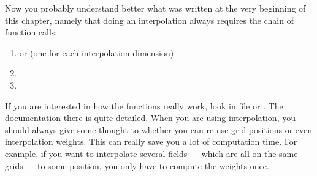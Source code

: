 Now you probably understand better what was written at the very
beginning of this chapter, namely that doing an interpolation always
requires the chain of function calls:
\begin{enumerate}
\item {} or  (one for each interpolation dimension)
\item {}
\item {}
\end{enumerate}
If you are interested in how the functions really work, look in file
 or .
The documentation there is quite detailed.  When you are using
interpolation, you should always give some thought to whether you can
re-use grid positions or even interpolation weights. This can really
save you a lot of computation time. For example, if you want to
interpolate several fields --- which are all on the same grids --- to
some position, you only have to compute the weights once.



